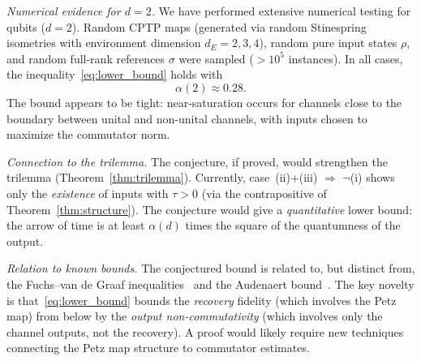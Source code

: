 \documentclass[prl,twocolumn,superscriptaddress,longbibliography]{revtex4-2}
\newcommand{\tauasym}{\tau}
\begin{document}
\emph{Numerical evidence for $d = 2$.}
We have performed extensive numerical testing for qubits ($d = 2$).
Random CPTP maps (generated via random Stinespring isometries
with environment dimension $d_E = 2, 3, 4$), random pure input
states $\rho$, and random full-rank references $\sigma$ were
sampled ($> 10^5$ instances).  In all cases, the
inequality~\eqref{eq:lower_bound} holds with
\begin{equation}
\alpha(2) \approx 0.28.
\end{equation}
The bound appears to be tight: near-saturation occurs for channels
close to the boundary between unital and non-unital channels,
with inputs chosen to maximize the commutator norm.

\emph{Connection to the trilemma.}
The conjecture, if proved, would strengthen the trilemma
(Theorem~\ref{thm:trilemma}).  Currently, case~(ii)+(iii)
$\Rightarrow$ $\neg$(i) shows only the \emph{existence} of inputs
with $\tauasym > 0$ (via the contrapositive of
Theorem~\ref{thm:structure}).  The conjecture would give a
\emph{quantitative} lower bound: the arrow of time is at least
$\alpha(d)$ times the square of the quantumness of the output.

\emph{Relation to known bounds.}
The conjectured bound is related to, but distinct from, the
Fuchs--van de Graaf inequalities~\cite{FuchsVanDeGraaf1999}
and the Audenaert bound~\cite{Audenaert2007}.  The key novelty
is that~\eqref{eq:lower_bound} bounds the \emph{recovery} fidelity
(which involves the Petz map) from below by the
\emph{output non-commutativity} (which involves only the channel
outputs, not the recovery).  A proof would likely require new
techniques connecting the Petz map structure to commutator
estimates.

\end{document}
